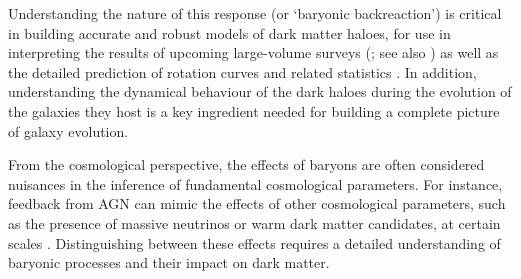 Understanding the nature of this response (or `baryonic backreaction') is critical in building accurate and robust models of dark matter haloes, for use in interpreting the results of upcoming large-volume surveys (\citealp{2015JCAP...12..049S,2018MNRAS.480.3962C,2021MNRAS.503.3596A}; see also \citealp{velliscig+14,hwvh15,mead+15}) as well as the detailed prediction of rotation curves and related statistics \citep{2021MNRAS.507..632P,2022MNRAS.517..130P}. In addition, understanding the dynamical behaviour of the dark haloes during the evolution of the galaxies they host is a key ingredient needed for building a complete picture of galaxy evolution.

From the cosmological perspective, the effects of baryons are often considered nuisances in the inference of fundamental cosmological parameters. For instance, feedback from AGN can mimic the effects of other cosmological parameters, such as the presence of massive neutrinos or warm dark matter candidates, at certain scales \citep{2019Chisari_etal_Baryfeedback,2020AricoAnguloetal_baryonifi}. Distinguishing between these effects requires a detailed understanding of baryonic processes and their impact on dark matter.










